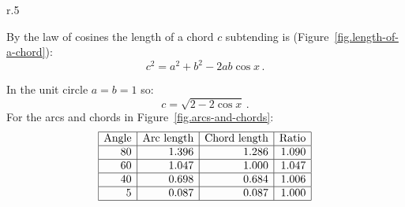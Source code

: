 \begin{wrapfigure}{r}{.5\textwidth}
\begin{center}
\vspace{-3ex}
\caption{The length of a chord corresponding to an arc of size $x$}\label{fig.length-of-a-chord}
\end{center}
\end{wrapfigure}
By the law of cosines the length of a chord $c$ subtending is (Figure~\ref{fig.length-of-a-chord}):
\[
c^2=a^2+b^2-2ab\cos x\,.
\]

In the unit circle $a=b=1$ so:
\[
c=\sqrt{2-2\cos x}\,.
\]
For the arcs and chords in Figure~\ref{fig.arcs-and-chords}:
\[
\begin{array}{|r|r|r|r|}
\hline
\multicolumn{1}{|c}{\textrm{Angle}} &
\multicolumn{1}{|c}{\textrm{Arc length}} &
\multicolumn{1}{|c}{\textrm{Chord length}} &
\multicolumn{1}{|c|}{\textrm{Ratio}}\\\hline
80 & 1.396 & 1.286  & 1.090\\\hline
60 & 1.047 & 1.000  & 1.047\\\hline
40 & 0.698 & 0.684 & 1.006\\\hline
5  & 0.087 & 0.087 &1.000 \\\hline
\end{array}
\]

